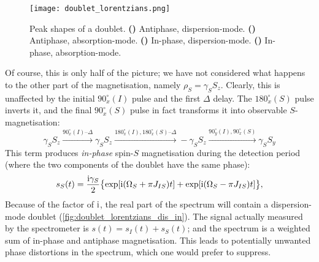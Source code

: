 \begin{figure}[ht]
    \centering
    \texttt{[image: doublet\_lorentzians.png]}
    {\label{fig:doublet_lorentzians_dis_anti}}
    {\label{fig:doublet_lorentzians_abs_anti}}
    {\label{fig:doublet_lorentzians_dis_in}}
    {\label{fig:doublet_lorentzians_abs_in}}
    \caption[Absorption- and dispersion-mode in-phase and antiphase doublets]{
        Peak shapes of a doublet.
        \textbf{()} Antiphase, dispersion-mode.
        \textbf{()} Antiphase, absorption-mode.
        \textbf{()} In-phase, dispersion-mode.
        \textbf{()} In-phase, absorption-mode.
    }
    \label{fig:doublet_lorentzians}
\end{figure}

Of course, this is only half of the picture; we have not considered what happens to the other part of the magnetisation, namely $\rho_S = \gamma_S S_z$.
Clearly, this is unaffected by the initial $90^\circ_x(I)$ pulse and the first $\Delta$ delay.
The $180^\circ_x(S)$ pulse inverts it, and the final $90^\circ_x(S)$ pulse in fact transforms it into observable $S$-magnetisation:
\begin{equation}
    \label{eq:inept_prodop_s}
    \gamma_S S_z \xrightarrow{90^\circ_x(I)\text{--}\Delta} \gamma_S S_z
    \xrightarrow{180^\circ_x(I),180^\circ_x(S)\text{--}\Delta} -\gamma_S S_z
    \xrightarrow{90^\circ_y(I),90^\circ_x(S)} \gamma_S S_y
\end{equation}
This term produces \textit{in-phase} spin-$S$ magnetisation during the detection period (where the two components of the doublet have the same phase):
\begin{equation}
    \label{eq:inept_fid_S}
    s_S(t) = \frac{\mathrm{i}\gamma_S}{2}\bigl\{\exp[\mathrm{i}(\Omega_S + \pi J_{IS})t] + \exp[\mathrm{i}(\Omega_S - \pi J_{IS})t]\bigr\},
\end{equation}
Because of the factor of $\mathrm{i}$, the real part of the spectrum will contain a dispersion-mode doublet (\cref{fig:doublet_lorentzians_dis_in}).
The signal actually measured by the spectrometer is $s(t) = s_I(t) + s_S(t)$; and the spectrum is a weighted sum of in-phase and antiphase magnetisation.
This leads to potentially unwanted phase distortions in the spectrum, which one would prefer to suppress.


